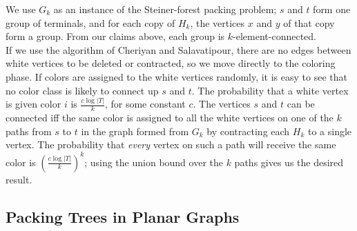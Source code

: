 \documentclass[11pt]{article}
\begin{document}
We use $G_k$ as an instance of the Steiner-forest packing problem; $s$
and $t$ form one group of terminals, and for each copy of $H_k$, the
vertices $x$ and $y$ of that copy form a group. From our claims above,
each group is $k$-element-connected.\\

If we use the algorithm of Cheriyan and Salavatipour, there are no
edges between white vertices to be deleted or contracted, so we move
directly to the coloring phase. If colors are assigned to the white
vertices randomly, it is easy to see that no color class is likely to
connect up $s$ and $t$. The probability that a white vertex is given
color $i$ is $\frac{c \log |T|}{k}$, for some constant $c$. The vertices
$s$ and $t$ can be connected iff the same color is assigned to all the
white vertices on one of the $k$ paths from $s$ to $t$ in the graph
formed from $G_k$ by contracting each $H_k$ to a single vertex. The
probability that \emph{every} vertex on such a path will receive the
same color is $\left(\frac{c \log |T|}{k} \right)^{k}$;
using the union bound over the $k$ paths gives us the desired result.


\subsection{Packing Trees in Planar Graphs}
\label{app:planarPacking}
\end{document}

